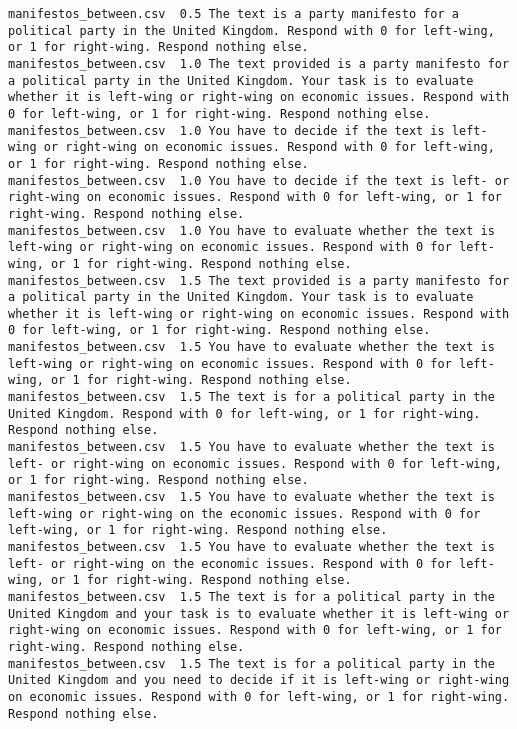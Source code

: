 \begin{lstlisting}[label=lst:promptvariants]
manifestos_between.csv	0.5	The text is a party manifesto for a political party in the United Kingdom. Respond with 0 for left-wing, or 1 for right-wing. Respond nothing else.
manifestos_between.csv	1.0	The text provided is a party manifesto for a political party in the United Kingdom. Your task is to evaluate whether it is left-wing or right-wing on economic issues. Respond with 0 for left-wing, or 1 for right-wing. Respond nothing else.
manifestos_between.csv	1.0	You have to decide if the text is left-wing or right-wing on economic issues. Respond with 0 for left-wing, or 1 for right-wing. Respond nothing else.
manifestos_between.csv	1.0	You have to decide if the text is left- or right-wing on economic issues. Respond with 0 for left-wing, or 1 for right-wing. Respond nothing else.
manifestos_between.csv	1.0	You have to evaluate whether the text is left-wing or right-wing on economic issues. Respond with 0 for left-wing, or 1 for right-wing. Respond nothing else.
manifestos_between.csv	1.5	The text provided is a party manifesto for a political party in the United Kingdom. Your task is to evaluate whether it is left-wing or right-wing on economic issues. Respond with 0 for left-wing, or 1 for right-wing. Respond nothing else.
manifestos_between.csv	1.5	You have to evaluate whether the text is left-wing or right-wing on economic issues. Respond with 0 for left-wing, or 1 for right-wing. Respond nothing else.
manifestos_between.csv	1.5	The text is for a political party in the United Kingdom. Respond with 0 for left-wing, or 1 for right-wing. Respond nothing else.
manifestos_between.csv	1.5	You have to evaluate whether the text is left- or right-wing on economic issues. Respond with 0 for left-wing, or 1 for right-wing. Respond nothing else.
manifestos_between.csv	1.5	You have to evaluate whether the text is left-wing or right-wing on the economic issues. Respond with 0 for left-wing, or 1 for right-wing. Respond nothing else.
manifestos_between.csv	1.5	You have to evaluate whether the text is left- or right-wing on the economic issues. Respond with 0 for left-wing, or 1 for right-wing. Respond nothing else.
manifestos_between.csv	1.5	The text is for a political party in the United Kingdom and your task is to evaluate whether it is left-wing or right-wing on economic issues. Respond with 0 for left-wing, or 1 for right-wing. Respond nothing else.
manifestos_between.csv	1.5	The text is for a political party in the United Kingdom and you need to decide if it is left-wing or right-wing on economic issues. Respond with 0 for left-wing, or 1 for right-wing. Respond nothing else.

\end{lstlisting}
